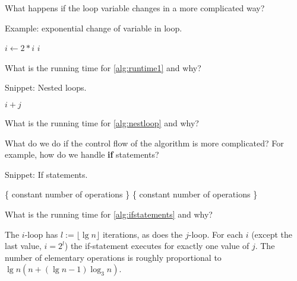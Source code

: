 What happens if the loop variable changes in a more complicated way?

\begin{algorithm}[H]
  \caption{Example: exponential change of variable in loop.
    \label{alg:runtime1}}
\begin{algorithmic}[0]
\State {}
	\State $i \gets 2*i$
	\State {} $i$
\EndWhile
\end{algorithmic}
\end{algorithm}

\begin{Boxample}[4]
What is the running time for \cref{alg:runtime1} and why?
\end{Boxample}

\begin{algorithm}[H]
  \caption{Snippet: Nested loops.}
    \label{alg:nestloop}
\begin{algorithmic}[0]
		\State {} $i+j$
	\EndFor
\EndFor
\end{algorithmic}
\end{algorithm}
\begin{Boxample}[4]
What is the running time for  \cref{alg:nestloop} and why?
\end{Boxample}

What do we do if the control flow of the algorithm is more complicated? For example, how do we handle \textbf{if} statements?

\begin{algorithm}[H]
  \caption{Snippet: If statements.}
  \label{alg:ifstatements}
\begin{algorithmic}[0]
				\State \{ constant number of operations \} 
			\EndFor
		\Else
				\State \{ constant number of operations \}
			\EndFor
		\EndIf
	\EndFor
\EndFor
\end{algorithmic}
\end{algorithm}
\begin{Boxample}[6]
What is the running time for \cref{alg:ifstatements} and why? 
\end{Boxample}

The $i$-loop has $l:=\lfloor \lg n \rfloor$ iterations, as does the $j$-loop. 
For each $i$ (except the last value, $i = 2^l$) the if-statement executes for 
exactly one value of $j$. The number of elementary operations is roughly 
proportional to $\lg n (n + (\lg n - 1)\log_3 n)$. 
\fi



